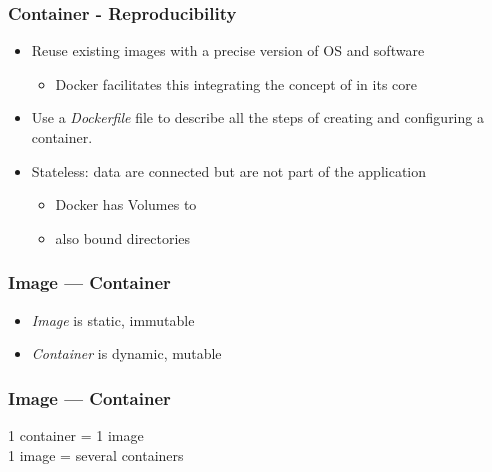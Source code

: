 \begin{frame}
\frametitle{Container - Reproducibility}
\begin{itemize}
\item  Reuse existing images with a precise version of OS and software
\begin{itemize}
   \item   Docker facilitates this integrating the concept of  in its core
\end{itemize}
\item  Use a \textit{Dockerfile} file to describe all the steps of creating and configuring a container.
\item  Stateless: data are connected but are not part of the application
\begin{itemize}
  \item   Docker has Volumes to 
  \item   also bound directories
\end{itemize}
\end{itemize}
\end{frame}


\begin{frame}
\frametitle{Image --- Container}

\begin{itemize}
\item \textit{Image} is static, immutable
\item \textit{Container} is dynamic, mutable
\end{itemize}
\end{frame}

\begin{frame}
\frametitle{Image --- Container}

\begin{center}
1 container = 1 image\\
\vspace{0.5cm}
1 image = several containers
\end{center}
\end{frame}